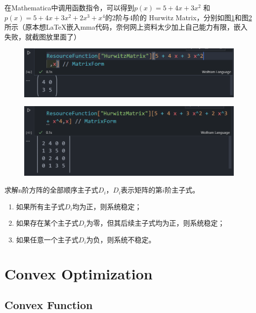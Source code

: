 \documentclass[lang=cn,10pt]{elegantbook}
\begin{document}
\begin{example}
	在Mathematica中调用函数指令，可以得到$p(x)=5+4x+3x^2$
	和$p(x)=5+4x+3x^2+2x^3+x^4$的2阶与4阶的
	Hurwitz Matrix，分别如图\ref{hurwitz1}和图\ref{hurwitz2}
	所示（原本想\LaTeX 嵌入mma代码，奈何网上资料太少加上自己能力有限，嵌入失败，就截图放里面了）
	\begin{figure}[h]
		\centering
		\includegraphics[scale=0.6]{img/hurwitz1.png}
		\caption{}
		\label{hurwitz1}
	\end{figure}
	\begin{figure}[h]
		\centering
		\includegraphics[scale=0.6]{img/hurwitz2.png}
		\caption{}
		\label{hurwitz2}
	\end{figure}
\end{example}

\begin{theorem}
	求解n阶方阵的全部顺序主子式$D_i$，$D_i$表示矩阵的第$i$阶主子式。
	\begin{enumerate}
		\item 如果所有主子式$D_i$均为正，则系统稳定；
		\item 如果存在某个主子式$D_i$为零，但其后续主子式均为正，则系统稳定；
		\item 如果任意一个主子式$D_i$为负，则系统不稳定。
	\end{enumerate}
\end{theorem}


\chapter{Convex Optimization}
\section{Convex Function}
\end{document}
